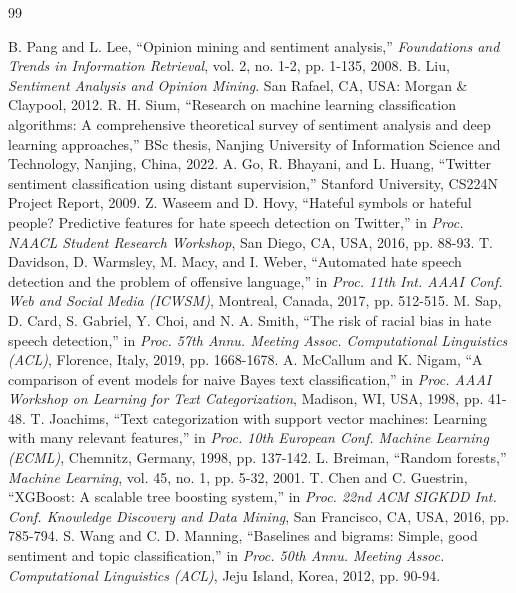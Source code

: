 \begin{thebibliography}{99}

 B. Pang and L. Lee, ``Opinion mining and sentiment analysis,'' \emph{Foundations and Trends in Information Retrieval}, vol. 2, no. 1-2, pp. 1-135, 2008.
 B. Liu, \emph{Sentiment Analysis and Opinion Mining}. San Rafael, CA, USA: Morgan \& Claypool, 2012.
 R. H. Sium, ``Research on machine learning classification algorithms: A comprehensive theoretical survey of sentiment analysis and deep learning approaches,'' BSc thesis, Nanjing University of Information Science and Technology, Nanjing, China, 2022.
 A. Go, R. Bhayani, and L. Huang, ``Twitter sentiment classification using distant supervision,'' Stanford University, CS224N Project Report, 2009.
 Z. Waseem and D. Hovy, ``Hateful symbols or hateful people? Predictive features for hate speech detection on Twitter,'' in \emph{Proc. NAACL Student Research Workshop}, San Diego, CA, USA, 2016, pp. 88-93.
 T. Davidson, D. Warmsley, M. Macy, and I. Weber, ``Automated hate speech detection and the problem of offensive language,'' in \emph{Proc. 11th Int. AAAI Conf. Web and Social Media (ICWSM)}, Montreal, Canada, 2017, pp. 512-515.
 M. Sap, D. Card, S. Gabriel, Y. Choi, and N. A. Smith, ``The risk of racial bias in hate speech detection,'' in \emph{Proc. 57th Annu. Meeting Assoc. Computational Linguistics (ACL)}, Florence, Italy, 2019, pp. 1668-1678.
 A. McCallum and K. Nigam, ``A comparison of event models for naive Bayes text classification,'' in \emph{Proc. AAAI Workshop on Learning for Text Categorization}, Madison, WI, USA, 1998, pp. 41-48.
 T. Joachims, ``Text categorization with support vector machines: Learning with many relevant features,'' in \emph{Proc. 10th European Conf. Machine Learning (ECML)}, Chemnitz, Germany, 1998, pp. 137-142.
 L. Breiman, ``Random forests,'' \emph{Machine Learning}, vol. 45, no. 1, pp. 5-32, 2001.
 T. Chen and C. Guestrin, ``XGBoost: A scalable tree boosting system,'' in \emph{Proc. 22nd ACM SIGKDD Int. Conf. Knowledge Discovery and Data Mining}, San Francisco, CA, USA, 2016, pp. 785-794.
 S. Wang and C. D. Manning, ``Baselines and bigrams: Simple, good sentiment and topic classification,'' in \emph{Proc. 50th Annu. Meeting Assoc. Computational Linguistics (ACL)}, Jeju Island, Korea, 2012, pp. 90-94.

\end{thebibliography}

